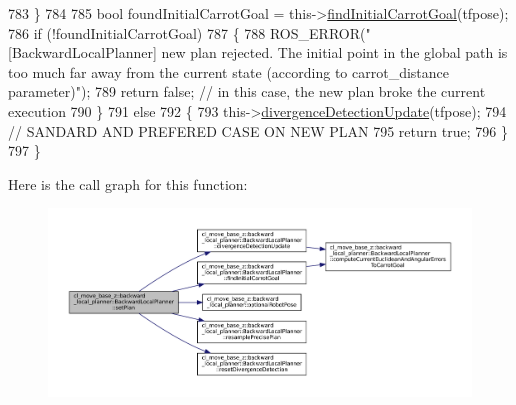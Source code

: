 \begin{DoxyCode}
783             \}
784 
785             \textcolor{keywordtype}{bool} foundInitialCarrotGoal = this->\hyperlink{classcl__move__base__z_1_1backward__local__planner_1_1BackwardLocalPlanner_a0025cd3ffaa04a6a02492a33673a78a1}{findInitialCarrotGoal}(tfpose);
786             \textcolor{keywordflow}{if} (!foundInitialCarrotGoal)
787             \{
788                 ROS\_ERROR(\textcolor{stringliteral}{"[BackwardLocalPlanner] new plan rejected. The initial point in the global path
       is too much far away from the current state (according to carrot\_distance parameter)"});
789                 \textcolor{keywordflow}{return} \textcolor{keyword}{false}; \textcolor{comment}{// in this case, the new plan broke the current execution}
790             \}
791             \textcolor{keywordflow}{else}
792             \{
793                 this->\hyperlink{classcl__move__base__z_1_1backward__local__planner_1_1BackwardLocalPlanner_ab1b01ecdb27641dde60661362d75465b}{divergenceDetectionUpdate}(tfpose);
794                 \textcolor{comment}{// SANDARD AND PREFERED CASE ON NEW PLAN}
795                 \textcolor{keywordflow}{return} \textcolor{keyword}{true};
796             \}
797         \}
\end{DoxyCode}
Here is the call graph for this function\+:
\nopagebreak
\begin{figure}[H]
\begin{center}
\leavevmode
\includegraphics[width=350pt]{classcl__move__base__z_1_1backward__local__planner_1_1BackwardLocalPlanner_ab11a0eec45f24b5a5a3987a50427eed4_cgraph}
\end{center}
\end{figure}
\mbox{\label{classcl__move__base__z_1_1backward__local__planner_1_1BackwardLocalPlanner_a6069866b4a3150883de3212d8e43e8f8}} 
